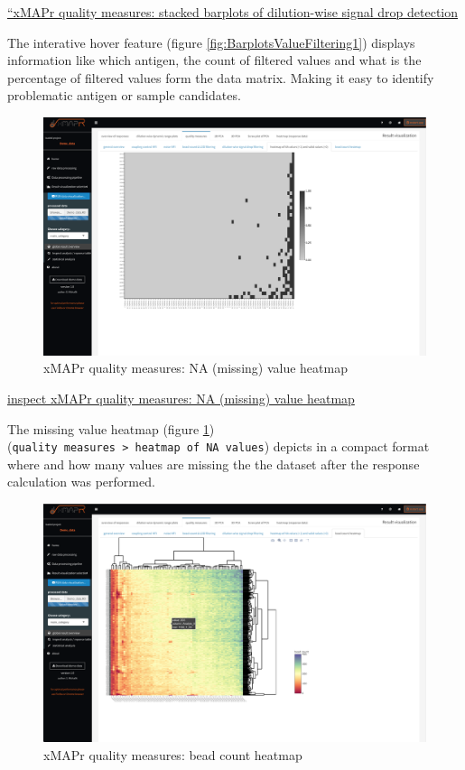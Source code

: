 \documentclass[]{book}
\theoremstyle{definition}
\theoremstyle{definition}
\theoremstyle{definition}
\theoremstyle{remark}
\begin{document}
\href{figures/quality_measures__value_filtering_signal_drop.png}{``xMAPr
quality measures: stacked barplots of dilution-wise signal drop
detection}

The interative hover feature (figure \ref{fig:BarplotsValueFiltering1})
displays information like which antigen, the count of filtered values
and what is the percentage of filtered values form the data matrix.
Making it easy to identify problematic antigen or sample candidates.

\begin{figure}
\includegraphics[width=50.47in]{figures/quality_measures__NA_value_heatmap} \caption{xMAPr quality measures: NA (missing) value heatmap}\label{fig:heatmapNA}
\end{figure}

\href{figures/quality_measures__NA_value_heatmap.png}{inspect xMAPr
quality measures: NA (missing) value heatmap}

The missing value heatmap (figure \ref{fig:heatmapNA})
(\texttt{quality\ measures\ \textgreater{}\ heatmap\ of\ NA\ values})
depicts in a compact format where and how many values are missing the
the dataset after the response calculation was performed.

\begin{figure}
\includegraphics[width=50.5in]{figures/quality_measures__bead_count_heatmap} \caption{xMAPr quality measures: bead count heatmap}\label{fig:heatmapBeadCount}
\end{figure}
\end{document}
